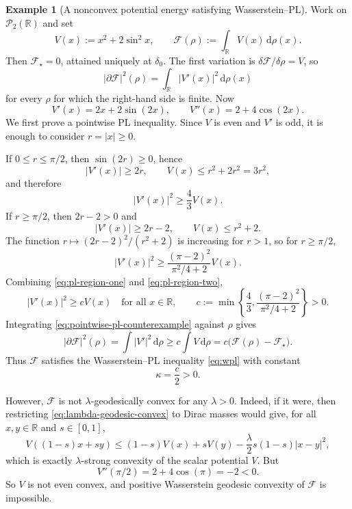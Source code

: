 \documentclass[11pt]{article}
\theoremstyle{definition}
\newtheorem{example}[theorem]{Example}
\newcommand{\Ptwo}{\mathcal P_2}
\newcommand{\F}{\mathcal F}
\newcommand{\R}{\mathbb R}
\newcommand{\dd}{\,\mathrm d}
\begin{document}
\begin{example}[A nonconvex potential energy satisfying Wasserstein--PL]
Work on $\Ptwo(\R)$ and set
\begin{equation}
        V(x):=x^2+2\sin^2 x,
        \qquad
        \F(\rho):=\int_{\R} V(x)\dd\rho(x).
        \label{eq:counterexample-energy}
\end{equation}
Then $\F_\star=0$, attained uniquely at $\delta_0$.
The first variation is $\delta\F/\delta\rho=V$, so
\begin{equation}
        |\partial\F|^2(\rho)=\int_{\R}|V'(x)|^2\dd\rho(x)
        \label{eq:potential-slope}
\end{equation}
for every $\rho$ for which the right-hand side is finite. Now
\[
        V'(x)=2x+2\sin(2x),
        \qquad
        V''(x)=2+4\cos(2x).
\]
We first prove a pointwise PL inequality. Since $V$ is even and $V'$ is odd, it is enough to consider $r=|x|\ge0$.

If $0\le r\le \pi/2$, then $\sin(2r)\ge0$, hence
\[
        |V'(x)|\ge 2r,
        \qquad
        V(x)\le r^2+2r^2=3r^2,
\]
and therefore
\begin{equation}
        |V'(x)|^2\ge \frac{4}{3}V(x).
        \label{eq:pl-region-one}
\end{equation}
If $r\ge\pi/2$, then $2r-2>0$ and
\[
        |V'(x)|\ge 2r-2,
        \qquad
        V(x)\le r^2+2.
\]
The function $r\mapsto (2r-2)^2/(r^2+2)$ is increasing for $r>1$, so for $r\ge\pi/2$,
\begin{equation}
        |V'(x)|^2
        \ge
        \frac{(\pi-2)^2}{\pi^2/4+2}V(x).
        \label{eq:pl-region-two}
\end{equation}
Combining \eqref{eq:pl-region-one} and \eqref{eq:pl-region-two},
\begin{equation}
        |V'(x)|^2\ge c V(x)
        \quad\text{for all }x\in\R,
        \qquad
        c:=\min\left\{\frac43,\frac{(\pi-2)^2}{\pi^2/4+2}\right\}>0.
        \label{eq:pointwise-pl-counterexample}
\end{equation}
Integrating \eqref{eq:pointwise-pl-counterexample} against $\rho$ gives
\[
        |\partial\F|^2(\rho)
        =\int |V'|^2\dd\rho
        \ge c\int V\dd\rho
        = c\bigl(\F(\rho)-\F_\star\bigr).
\]
Thus $\F$ satisfies the Wasserstein--PL inequality \eqref{eq:wpl} with constant
\begin{equation}
        \kappa=\frac{c}{2}>0.
        \label{eq:counterexample-kappa}
\end{equation}

However, $\F$ is not $\lambda$-geodesically convex for any $\lambda>0$. Indeed, if it were, then restricting \eqref{eq:lambda-geodesic-convex} to Dirac masses would give, for all $x,y\in\R$ and $s\in[0,1]$,
\[
        V((1-s)x+sy)
        \le (1-s)V(x)+sV(y)-\frac{\lambda}{2}s(1-s)|x-y|^2,
\]
which is exactly $\lambda$-strong convexity of the scalar potential $V$. But
\[
        V''(\pi/2)=2+4\cos(\pi)=-2<0.
\]
So $V$ is not even convex, and positive Wasserstein geodesic convexity of $\F$ is impossible.
\end{example}
\end{document}
